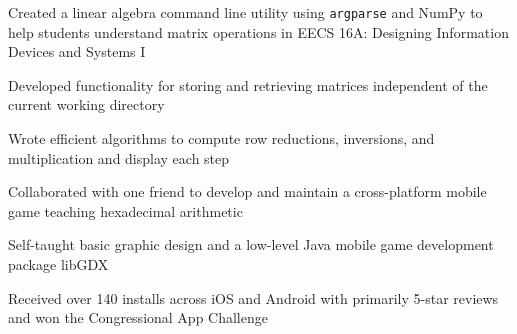 \documentclass[]{deedy-resume-openfont}
\begin{document}
\begin{minipage}[t]{0.66\textwidth}
\begin{tightemize}
\item Created a linear algebra command line utility using \texttt{argparse} and NumPy to help students understand matrix operations in EECS 16A: Designing Information Devices and Systems I
\item Developed functionality for storing and retrieving matrices independent of the current working directory
\item Wrote efficient algorithms to compute row reductions, inversions, and multiplication and display each step
\end{tightemize}

\begin{tightemize}
\item Collaborated with one friend to develop and maintain a cross-platform mobile game teaching hexadecimal arithmetic
\item Self-taught basic graphic design and a low-level Java mobile game development package libGDX
\item Received over 140 installs across iOS and Android with primarily 5-star reviews and won the Congressional App Challenge
\end{tightemize}

\end{minipage} 
\end{document}

